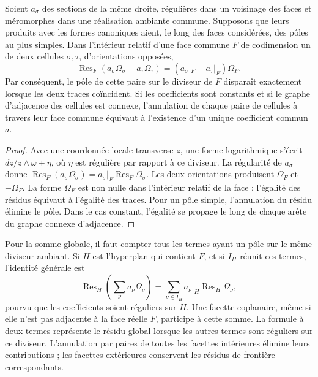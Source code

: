 \begin{theorem}
\label{thm:compat-pegado}
Soient \(a_\sigma\) des sections de la même droite, régulières dans un
voisinage des faces et méromorphes dans une réalisation ambiante commune.
Supposons que leurs produits avec les formes canoniques aient, le
long des faces considérées, des pôles au plus simples. Dans
l’intérieur relatif d’une face commune \(F\) de codimension un de deux cellules
\(\sigma,\tau\), d’orientations opposées,
\begin{equation}
 \operatorname{Res}_F\left(a_\sigma\Omega_\sigma+a_\tau\Omega_\tau\right)
 =\left(a_\sigma|_F-a_\tau|_F\right)\Omega_F.
 \label{eq:compat-defecto-frontera}
\end{equation}
Par conséquent, le pôle de cette paire sur le diviseur de \(F\) disparaît
exactement lorsque les deux traces coïncident. Si les coefficients sont
constants et si le graphe d’adjacence des cellules est connexe, l’annulation
de chaque paire de cellules à travers leur face commune équivaut à l’existence
d’un unique coefficient commun \(a\).
\end{theorem}
\begin{proof}
Avec une coordonnée locale transverse \(z\), une forme logarithmique s'écrit \(dz/z\wedge\omega+\eta\), où \(\eta\) est régulière par rapport à ce diviseur. La régularité de \(a_\sigma\) donne \(\operatorname{Res}_F(a_\sigma\Omega_\sigma)
=a_\sigma|_F\operatorname{Res}_F\Omega_\sigma\). Les deux orientations produisent \(\Omega_F\) et \(-\Omega_F\). La forme \(\Omega_F\) est non nulle dans l'intérieur relatif de la face ; l'égalité des résidus équivaut à l'égalité des traces. Pour un pôle simple, l'annulation du résidu élimine le pôle. Dans le cas constant, l'égalité se propage le long de chaque arête du graphe connexe d'adjacence.
\end{proof}

Pour la somme globale, il faut compter tous les termes ayant un pôle sur le
même diviseur ambiant. Si \(H\) est l’hyperplan qui contient \(F\),
et si \(I_H\) réunit ces termes, l’identité générale est
\[
 \operatorname{Res}_{H}\left(\sum_\nu a_\nu\Omega_\nu\right)
 =\sum_{\nu\in I_H}a_\nu|_H\operatorname{Res}_H\Omega_\nu,
\]
pourvu que les coefficients soient réguliers sur \(H\). Une facette
coplanaire, même si elle n’est pas adjacente à la face réelle \(F\), participe à cette
somme. La formule à deux termes représente le résidu global lorsque
les autres termes sont réguliers sur ce diviseur. L’annulation
par paires de toutes les facettes intérieures élimine leurs contributions ;
les facettes extérieures conservent les résidus de frontière correspondants.

